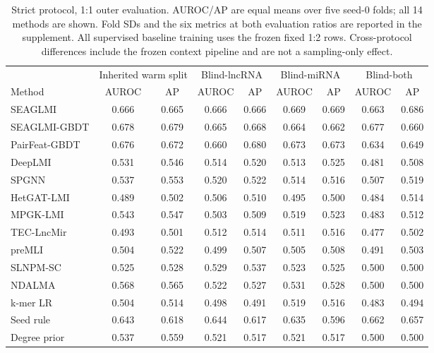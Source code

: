 \begin{table}[t]
\centering
\caption{Strict protocol, 1:1 outer evaluation. AUROC/AP are equal means over five seed-0 folds; all 14 methods are shown. Fold SDs and the six metrics at both evaluation ratios are reported in the supplement. All supervised baseline training uses the frozen fixed 1:2 rows. Cross-protocol differences include the frozen context pipeline and are not a sampling-only effect.}
\label{tab:strict}
\scriptsize
\setlength{\tabcolsep}{3pt}
\begin{tabular}{lcccccccc}
\toprule
 & \multicolumn{2}{c}{Inherited warm split} & \multicolumn{2}{c}{Blind-lncRNA} & \multicolumn{2}{c}{Blind-miRNA} & \multicolumn{2}{c}{Blind-both} \\
\cmidrule(lr){2-3}\cmidrule(lr){4-5}\cmidrule(lr){6-7}\cmidrule(lr){8-9}
Method & AUROC & AP & AUROC & AP & AUROC & AP & AUROC & AP \\
\midrule
SEAGLMI & 0.666 & 0.665 & 0.666 & 0.666 & 0.669 & 0.669 & 0.663 & 0.686 \\
SEAGLMI-GBDT & 0.678 & 0.679 & 0.665 & 0.668 & 0.664 & 0.662 & 0.677 & 0.660 \\
PairFeat-GBDT & 0.676 & 0.672 & 0.660 & 0.680 & 0.673 & 0.673 & 0.634 & 0.649 \\
DeepLMI & 0.531 & 0.546 & 0.514 & 0.520 & 0.513 & 0.525 & 0.481 & 0.508 \\
SPGNN & 0.537 & 0.553 & 0.520 & 0.522 & 0.514 & 0.516 & 0.507 & 0.519 \\
HetGAT-LMI & 0.489 & 0.502 & 0.506 & 0.510 & 0.495 & 0.500 & 0.484 & 0.514 \\
MPGK-LMI & 0.543 & 0.547 & 0.503 & 0.509 & 0.519 & 0.523 & 0.483 & 0.512 \\
TEC-LncMir & 0.493 & 0.501 & 0.512 & 0.514 & 0.511 & 0.516 & 0.477 & 0.502 \\
preMLI & 0.504 & 0.522 & 0.499 & 0.507 & 0.505 & 0.508 & 0.491 & 0.503 \\
SLNPM-SC & 0.525 & 0.528 & 0.529 & 0.537 & 0.523 & 0.525 & 0.500 & 0.500 \\
NDALMA & 0.568 & 0.565 & 0.522 & 0.527 & 0.531 & 0.528 & 0.500 & 0.500 \\
k-mer LR & 0.504 & 0.514 & 0.498 & 0.491 & 0.519 & 0.516 & 0.483 & 0.494 \\
Seed rule & 0.643 & 0.618 & 0.644 & 0.617 & 0.635 & 0.596 & 0.662 & 0.657 \\
Degree prior & 0.537 & 0.559 & 0.521 & 0.517 & 0.521 & 0.517 & 0.500 & 0.500 \\
\bottomrule
\end{tabular}
\end{table}
